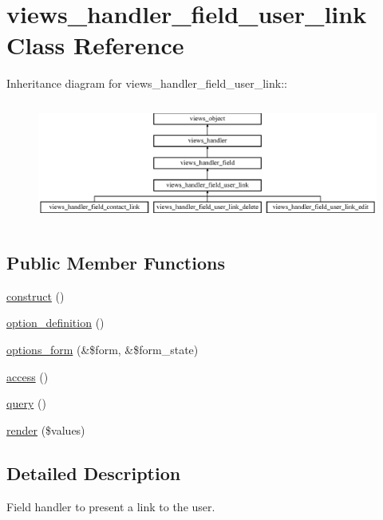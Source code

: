 \hypertarget{classviews__handler__field__user__link}{
\section{views\_\-handler\_\-field\_\-user\_\-link Class Reference}
\label{classviews__handler__field__user__link}
}
Inheritance diagram for views\_\-handler\_\-field\_\-user\_\-link::\begin{figure}[H]
\begin{center}
\leavevmode
\includegraphics[height=4.02299cm]{classviews__handler__field__user__link}
\end{center}
\end{figure}
\subsection*{Public Member Functions}
\begin{CompactItemize}
\item 
\hyperlink{classviews__handler__field__user__link_3c0e66ff0504b344066db923819456f7}{construct} ()
\item 
\hyperlink{classviews__handler__field__user__link_61509d4fd4bc1c98a52e550c56d42b5d}{option\_\-definition} ()
\item 
\hyperlink{classviews__handler__field__user__link_952944015feaaab1fb2d0abc29d5c2b5}{options\_\-form} (\&\$form, \&\$form\_\-state)
\item 
\hyperlink{classviews__handler__field__user__link_00708207b597556c70cba91816a03963}{access} ()
\item 
\hyperlink{classviews__handler__field__user__link_b64eedee54360407b203c3d7474c40f2}{query} ()
\item 
\hyperlink{classviews__handler__field__user__link_f81b37cfa8e0c2363ad8ed9bb601cd14}{render} (\$values)
\end{CompactItemize}


\subsection{Detailed Description}
Field handler to present a link to the user. 

